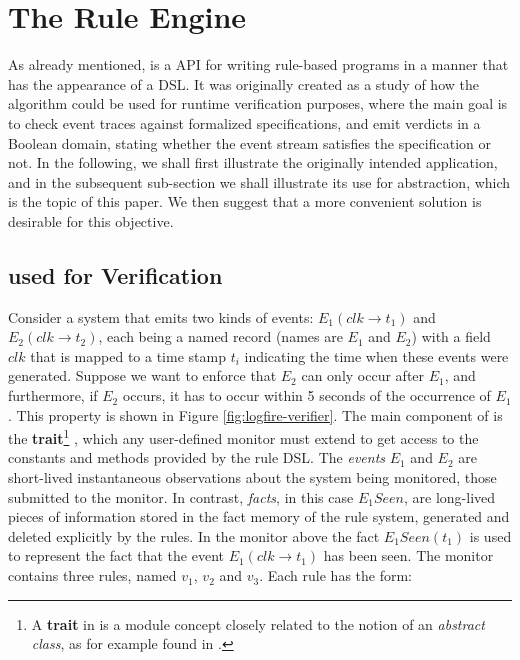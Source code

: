 
\section{The \logfire{} Rule Engine}
\label{sec:logfire}

As already mentioned, \logfire{} is a \scala{} API for writing
rule-based programs in a manner that has the appearance of a DSL.  It
was originally created as a study of how the
\rete{} algorithm could be used for runtime verification purposes,
where the main goal is to check event traces against formalized
specifications, and emit verdicts in a Boolean domain, stating whether
the event stream satisfies the specification or not. In the following,
we shall first illustrate the originally intended application, and in
the subsequent sub-section we shall illustrate its use for abstraction,
which is the topic of this paper. We then suggest that a more
convenient solution is desirable for this objective.

\subsection{\logfire{} used for Verification}

Consider a system that emits two kinds of events: $E_1(clk \rightarrow
t_1)$ and $E_2(clk \rightarrow t_2)$, each being a named record (names are
$E_1$ and $E_2$) with a field $clk$ that is mapped to a time stamp $t_i$
indicating the time when these events were generated. Suppose we want
to enforce that $E_2$ can only occur after $E_1$, and furthermore, if
$E_2$ occurs, it has to occur within 5 seconds of the occurrence of
$E_1$.  This property is shown in Figure
\ref{fig:logfire-verifier}. The main component of \logfire{} is the
{\bf trait}\footnote{A {\bf trait} in \scala{} is a module concept
closely related to the notion of an {\em abstract class}, as for
example found in \java.} , which any user-defined
monitor must extend to get access to the constants and methods
provided by the rule DSL. The {\em events} $E_1$ and $E_2$ are
short-lived instantaneous observations about the system being
monitored, those submitted to the monitor.  In contrast, {\em facts},
in this case $E_1Seen$, are long-lived pieces of information stored in
the fact memory of the rule system, generated and deleted explicitly
by the rules.  In the monitor above the fact $E_1Seen(t_1)$ is used to
represent the fact that the event $E_1(clk \rightarrow t_1)$ has been
seen.  The monitor contains three rules, named $v_1$, $v_2$ and
$v_3$. Each rule has the form:


